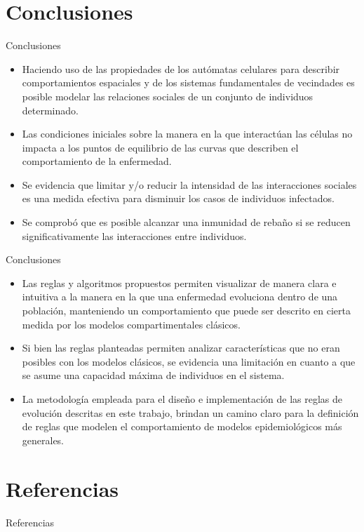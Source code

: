 \documentclass[9pt]{beamer}
\begin{document}
\section{Conclusiones}
\begin{frame}{Conclusiones}
\begin{itemize}
    \item Haciendo uso de las propiedades de los autómatas celulares para describir comportamientos espaciales y de los sistemas fundamentales de vecindades es posible modelar las relaciones sociales de un conjunto de individuos determinado.
    \item Las condiciones iniciales sobre la manera en la que interactúan las células no impacta a los puntos de equilibrio de las curvas que describen el comportamiento de la enfermedad.
    \item Se evidencia que limitar y/o reducir la intensidad de las interacciones sociales es una medida efectiva para disminuir los casos de individuos infectados.
    \item Se comprobó que es posible alcanzar una inmunidad de rebaño si se reducen significativamente las interacciones entre individuos.
\end{itemize}
\end{frame}

\begin{frame}{Conclusiones}
\begin{itemize}
    \item Las reglas y algoritmos propuestos permiten visualizar de manera clara e intuitiva a la manera en la que una enfermedad evoluciona dentro de una población, manteniendo un comportamiento que puede ser descrito en cierta medida por los modelos compartimentales clásicos.
    \item Si bien las reglas planteadas permiten analizar características que no eran posibles con los modelos clásicos, se evidencia una limitación en cuanto a que se asume una capacidad máxima de individuos en el sistema.
    \item La metodología empleada para el diseño e implementación de las reglas de evolución descritas en este trabajo, brindan un camino claro para la definición de reglas que modelen el comportamiento de modelos epidemiológicos más generales.
\end{itemize}
\end{frame}

\section{Referencias}
\begin{frame}[allowframebreaks]{Referencias}

\end{frame}
\end{document}
